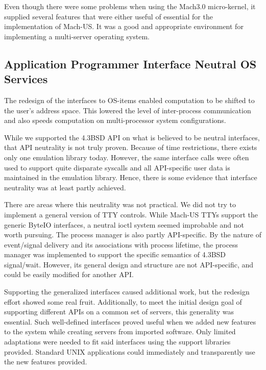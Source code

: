 Even though there were some problems when using the Mach3.0 micro-kernel,
it supplied several features that were either useful of essential for the
implementation of Mach-US.  It was a good and appropriate environment for
implementing a multi-server operating system.

\subsection{Application Programmer Interface Neutral OS Services}
The redesign of the interfaces to OS-items enabled
computation to be shifted to the user's address space.  This
lowered the level of inter-process communication and also
speeds computation on multi-processor system configurations.

While we supported the 4.3BSD API
on what is believed to be neutral interfaces, that
API neutrality is not truly proven.
Because of time restrictions, there exists only one emulation library today.
However, the same interface calls were often
used to support quite disparate syscalls and all
API-specific user data is maintained in the emulation library.
Hence, there is some evidence
that interface neutrality was at least partly achieved.

There are areas where this neutrality was not practical.
We did not try to
implement a general version of TTY controls.  While Mach-US TTYs
support the generic
ByteIO interfaces, a neutral ioctl system seemed improbable and
not worth pursuing.  
The process manager is also partly API-specific.
By the nature of event/signal delivery
and its associations with process lifetime, the process manager was implemented
to support the specific semantics of 4.3BSD signal/wait.  
However, its general design
and structure are not API-specific, and could be easily modified for
another API.

Supporting the generalized interfaces caused additional work, but the
redesign effort showed
some real fruit.  Additionally, to meet the initial design goal
of supporting different
APIs on a common set of servers, this generality was essential.
Such well-defined interfaces proved useful when we added
new features to the system while creating servers from imported software.
Only limited adaptations were needed to fit said interfaces
using the support libraries provided.
Standard UNIX applications could immediately and transparently use the
new features provided.

